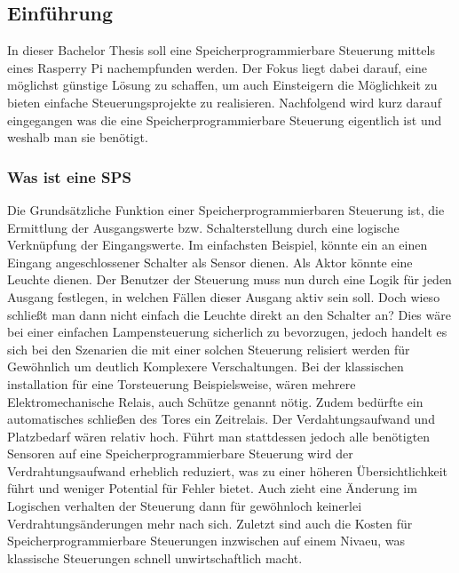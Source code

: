 

\renewcommand{\pthImg}{\pthVerlauf/img}
\renewcommand{\pthDoc}{\pthVerlauf/doc}


\subsection{Einführung}

In dieser Bachelor Thesis soll eine Speicherprogrammierbare Steuerung mittels eines Rasperry Pi nachempfunden werden. Der Fokus liegt dabei darauf, eine möglichst günstige Lösung zu schaffen, um auch Einsteigern die Möglichkeit zu bieten einfache Steuerungsprojekte zu realisieren. Nachfolgend wird kurz darauf eingegangen was die eine Speicherprogrammierbare Steuerung eigentlich ist und weshalb man sie benötigt. 
\subsubsection{Was ist eine SPS}
Die Grundsätzliche Funktion einer Speicherprogrammierbaren Steuerung ist, die Ermittlung der Ausgangswerte bzw. Schalterstellung durch eine logische Verknüpfung der Eingangswerte. Im einfachsten Beispiel, könnte ein an einen Eingang angeschlossener Schalter als Sensor dienen. Als Aktor könnte eine Leuchte dienen. Der Benutzer der Steuerung muss nun durch eine Logik für jeden Ausgang festlegen, in welchen Fällen dieser Ausgang aktiv sein soll. Doch wieso schließt man dann nicht einfach die Leuchte direkt an den Schalter an? Dies wäre bei einer einfachen Lampensteuerung sicherlich zu bevorzugen, jedoch handelt es sich bei den Szenarien die mit einer solchen Steuerung relisiert werden für Gewöhnlich um deutlich Komplexere Verschaltungen. Bei der klassischen installation für eine Torsteuerung Beispielsweise, wären mehrere Elektromechanische Relais, auch Schütze genannt nötig. Zudem bedürfte ein automatisches schließen des Tores ein Zeitrelais. Der Verdahtungsaufwand und Platzbedarf wären relativ hoch. Führt man stattdessen jedoch alle benötigten Sensoren auf eine Speicherprogrammierbare Steuerung wird der Verdrahtungsaufwand erheblich reduziert, was zu einer höheren Übersichtlichkeit führt und weniger Potential für Fehler bietet. Auch zieht eine Änderung im Logischen verhalten der Steuerung dann für gewöhnloch keinerlei Verdrahtungsänderungen mehr nach sich. Zuletzt sind auch die Kosten für Speicherprogrammierbare Steuerungen inzwischen auf einem Nivaeu, was klassische Steuerungen schnell unwirtschaftlich macht. 

